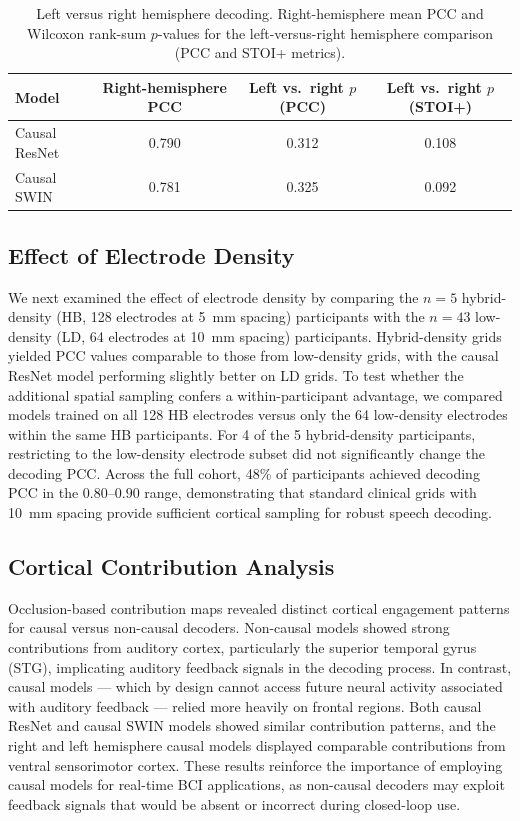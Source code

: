 \documentclass[10pt]{article}
\begin{document}
\begin{table}[htbp]
\centering
\caption{Left versus right hemisphere decoding. Right-hemisphere mean PCC and Wilcoxon rank-sum $p$-values for the left-versus-right hemisphere comparison (PCC and STOI+ metrics).}
\label{tab:hemisphere}
\begin{tabular}{lccc}
\toprule
Model & Right-hemisphere PCC & Left vs.\ right $p$ (PCC) & Left vs.\ right $p$ (STOI+) \\
\midrule
Causal ResNet & 0.790 & 0.312 & 0.108 \\
Causal SWIN   & 0.781 & 0.325 & 0.092 \\
\bottomrule
\end{tabular}
\end{table}

\subsection{Effect of Electrode Density}

We next examined the effect of electrode density by comparing the $n=5$ hybrid-density (HB, 128 electrodes at 5~mm spacing) participants with the $n=43$ low-density (LD, 64 electrodes at 10~mm spacing) participants. Hybrid-density grids yielded PCC values comparable to those from low-density grids, with the causal ResNet model performing slightly better on LD grids. To test whether the additional spatial sampling confers a within-participant advantage, we compared models trained on all 128 HB electrodes versus only the 64 low-density electrodes within the same HB participants. For 4 of the 5 hybrid-density participants, restricting to the low-density electrode subset did not significantly change the decoding PCC. Across the full cohort, 48\% of participants achieved decoding PCC in the $0.80$--$0.90$ range, demonstrating that standard clinical grids with 10~mm spacing provide sufficient cortical sampling for robust speech decoding.

\subsection{Cortical Contribution Analysis}

Occlusion-based contribution maps revealed distinct cortical engagement patterns for causal versus non-causal decoders. Non-causal models showed strong contributions from auditory cortex, particularly the superior temporal gyrus (STG), implicating auditory feedback signals in the decoding process. In contrast, causal models --- which by design cannot access future neural activity associated with auditory feedback --- relied more heavily on frontal regions. Both causal ResNet and causal SWIN models showed similar contribution patterns, and the right and left hemisphere causal models displayed comparable contributions from ventral sensorimotor cortex. These results reinforce the importance of employing causal models for real-time BCI applications, as non-causal decoders may exploit feedback signals that would be absent or incorrect during closed-loop use.
\end{document}
